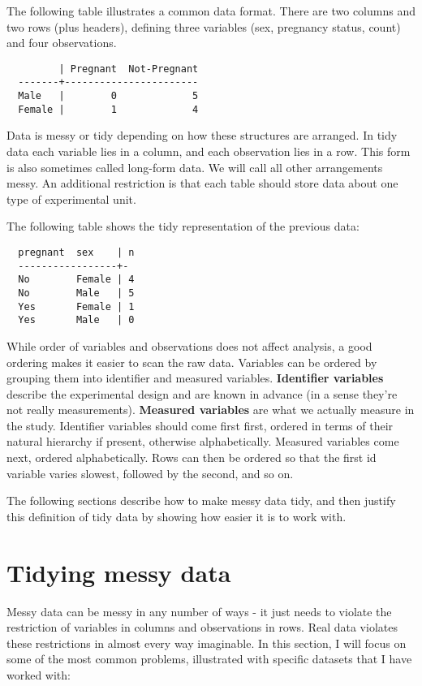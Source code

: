 \documentclass[oneside]{article}
\begin{document}
The following table illustrates a common data format. There are two columns and two rows (plus headers), defining three variables (sex, pregnancy status, count) and four observations.

\begin{verbatim}
         | Pregnant  Not-Pregnant
  -------+-----------------------
  Male   |        0             5
  Female |        1             4
\end{verbatim}

Data is messy or tidy depending on how these structures are arranged. In tidy data each variable lies in a column, and each observation lies in a row. This form is also sometimes called long-form data. We will call all other arrangements messy.  An additional restriction is that each table should store data about one type of experimental unit.

The following table shows the tidy representation of the previous data:

\begin{verbatim}
  pregnant  sex    | n
  -----------------+-
  No        Female | 4
  No        Male   | 5
  Yes       Female | 1
  Yes       Male   | 0
\end{verbatim}

While order of variables and observations does not affect analysis, a good ordering makes it easier to scan the raw data. Variables can be ordered by grouping them into identifier and measured variables. \textbf{Identifier variables} describe the experimental design and are known in advance (in a sense they're not really measurements). \textbf{Measured variables} are what we actually measure in the study. Identifier variables should come first first, ordered in terms of their natural hierarchy if present, otherwise alphabetically. Measured variables come next, ordered alphabetically. Rows can then be ordered so that the first id variable varies slowest, followed by the second, and so on.

The following sections describe how to make messy data tidy, and then justify this definition of tidy data by showing how easier it is to work with.

\section{Tidying messy data}

Messy data can be messy in any number of ways - it just needs to violate the restriction of variables in columns and observations in rows. Real data violates these restrictions in almost every way imaginable. In this section, I will focus on some of the most common problems, illustrated with specific datasets that I have worked with:
\end{document}
